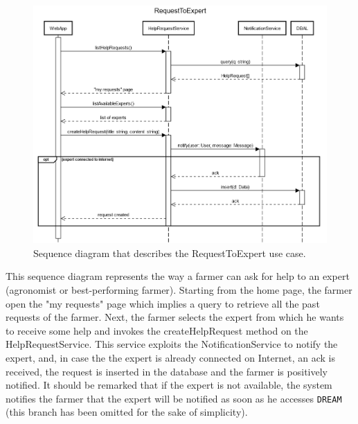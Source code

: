 \documentclass{article}
\begin{document}
\newpage
\begin{figure}[H]
   \centering
   \includegraphics[scale=0.40]{diagrams/sequence diagrams/RequestToExpert.png}
    \caption{Sequence diagram that describes the RequestToExpert use case.}
\end{figure}
This sequence diagram represents the way a farmer can ask for help to an expert (agronomist or best-performing farmer). Starting from the home page, the farmer open the "my requests" page which implies a query to retrieve all the past requests of the farmer. Next, the farmer selects the expert from which he wants to receive some help and invokes the createHelpRequest method on the HelpRequestService. This service exploits the NotificationService to notify the expert, and, in case the the expert is already connected on Internet, an ack is received, the request is inserted in the database and the farmer is positively notified. It should be remarked that if the expert is not available, the system notifies the farmer that the expert will be notified as soon as he accesses \verb|DREAM| (this branch has been omitted for the sake of simplicity).
\end{document}

